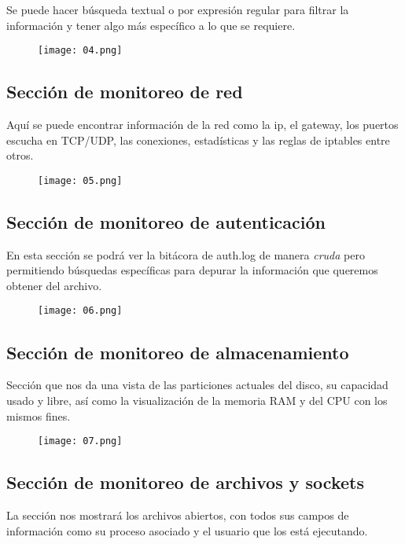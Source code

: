 \documentclass[12pt]{article}
\begin{document}
Se puede hacer búsqueda textual o por expresión regular para filtrar la información y tener algo más específico a lo que se requiere.

\begin{figure}[H]
  \centering
  \texttt{[image: 04.png]}  
\end{figure}

\subsection{Sección de monitoreo de red}
Aquí se puede encontrar información de la red como la ip, el gateway, los puertos escucha en TCP/UDP, las conexiones, estadísticas y las reglas de iptables entre otros.

\begin{figure}[H]
  \centering
  \texttt{[image: 05.png]}  
\end{figure}

\subsection{Sección de monitoreo de autenticación}

En esta sección se podrá ver la bitácora de auth.log de manera \textit{cruda} pero permitiendo búsquedas específicas para depurar la información que queremos obtener del archivo.

\begin{figure}[H]
  \centering
  \texttt{[image: 06.png]}  
\end{figure}


\subsection{Sección de monitoreo de almacenamiento}
Sección que nos da una vista de las particiones actuales del disco, su capacidad usado y libre, así como la visualización de la memoria RAM y del CPU con los mismos fines.

\begin{figure}[H]
  \centering
  \texttt{[image: 07.png]}
  
\end{figure}

\subsection{Sección de monitoreo de archivos y sockets}
La sección nos mostrará los archivos abiertos, con todos sus campos de información como su proceso asociado y el usuario que los está ejecutando.\\
\end{document}
